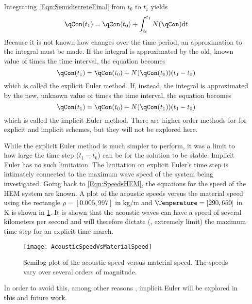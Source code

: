 Integrating \cref{Eqn:SemidiscreteFinal} from $t_0$ to $t_1$ yields
\begin{equation}
    \qCon(t_1) = \qCon(t_0) + \int_{t_0}^{t_1} N(\qCon) \mathrm{d}t
\end{equation}
Because it is not known how \qCon changes over the time period, an approximation to the integral must be made.
If the integral is approximated by the old, known value of \qCon times the time interval, the equation becomes
\begin{equation}
    \qCon(t_1) = \qCon(t_0) + N(\qCon(t_0)) (t_1 - t_0)
\end{equation}
which is called the explicit Euler method.
If, instead, the integral is approximated by the new, unknown value of \qCon times the time interval, the equation becomes
\begin{equation}
    \qCon(t_1) = \qCon(t_0) + N(\qCon(t_1)) (t_1 - t_0)
\end{equation}
which is called the implicit Euler method.
There are higher order methods for for explicit and implicit schemes, but they will not be explored here.

While the explicit Euler method is much simpler to perform, it was a limit to how large the time step ($t_1 - t_0$) can be for the solution to be stable.
Implicit Euler has no such limitation.
The limitation on explicit Euler's time step is intimately connected to the maximum wave speed of the system being investigated.
Going back to \cref{Eqn:SpeedsHEM}, the equations for the speed of the HEM system are known.
A plot of the acoustic speeds versus the material speed using the rectangle $\rho = [0.005,997]$ in kg/m and $\Temperature = [290,650]$ in K is shown in \cref{Figure:AcousticVSMaterial}.
It is shown that the acoustic waves can have a speed of several kilometers per second and will therefore dictate (\ie, extremely limit) the maximum time step for an explicit time march.
\begin{figure}%
    \centering
    \caption[Acoustic speed versus material speed]{Semilog plot of the acoustic speed versus material speed.  The speeds vary over several orders of magnitude.}%
    \label{Figure:AcousticVSMaterial}%
    \texttt{[image: AcousticSpeedVsMaterialSpeed]}%
\end{figure}
In order to avoid this, among other reasons \cite{gottlieb_high_2009}, implicit Euler will be explored in this and future work.

